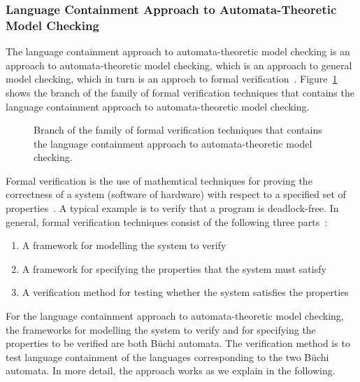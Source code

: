 

\subsubsection{Language Containment Approach to Automata-Theoretic Model Checking}
The language containment approach to automata-theoretic model checking is an approach to automata-theoretic model checking, which is an approach to general model checking, which in turn is an approch to formal verification~\cite{2007_vardi_model_checking}. Figure~\ref{model_checking} shows the branch of the family of formal verification techniques that contains the language containment approach to automata-theoretic model checking.

\begin{figure}[htb]
\centering
\ModelChecking
\caption{Branch of the family of formal verification techniques that contains the language containment approach to automata-theoretic model checking.}
\label{model_checking}
\end{figure}

Formal verification is the use of mathemtical techniques for proving the correctness of a system (software of hardware) with respect to a specified set of properties~\cite{2007_vardi_model_checking}. A typical example is to verify that a program is deadlock-free. In general, formal verification techniques consist of the following three parts~\cite{huth2004logic}:

\begin{enumerate}
\item A framework for modelling the system to verify
\item A framework for specifying the properties that the system must satisfy
\item A verification method for testing whether the system satisfies the properties
\end{enumerate}

For the language containment approach to automata-theoretic model checking, the frameworks for modelling the system to verify and for specifying the properties to be verified are both Büchi automata. The verification method is to test language containment of the languages corresponding to the two Büchi automata. In more detail, the approach works as we explain in the following.

